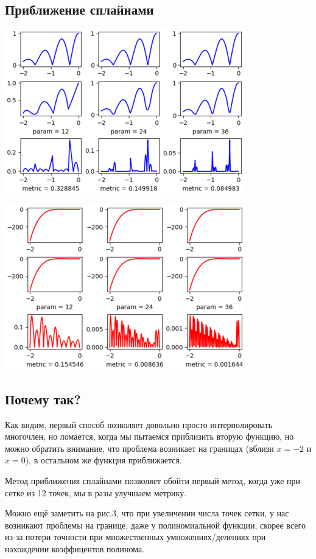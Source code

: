 \documentclass{article}
\begin{document}
\subsection{Приближение сплайнами}
\includegraphics{Figure_101.png}

\includegraphics{Figure_100.png}

\subsection{Почему так?}
Как видим, первый способ позволяет довольно просто интерполировать многочлен, но ломается, когда мы пытаемся приблизить вторую функцию, но можно обратить внимание, что проблема возникает на границах (вблизи \(x = -2\) и \(x = 0\)), в остальном же функция приближается.

Метод приближения сплайнами позволяет обойти первый метод, когда уже при сетке из 12 точек, мы в разы улучшаем метрику.

Можно ещё заметить на рис.3, что при увеличении числа точек сетки, у нас возникают проблемы на границе, даже у полиномиальной функции, скорее всего из-за потери точности при множественных умножениях/делениях при нахождении коэффицентов полинома.
\end{document}
